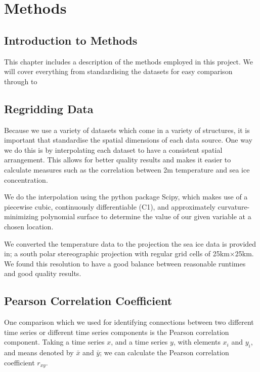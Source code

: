 \chapter{Methods}
\label{Chap:Methods}

\section{Introduction to Methods}
This chapter includes a description of the methods employed in this project. We will cover everything from standardising the datasets for easy comparison through to 

\section{Regridding Data}
Because we use a variety of datasets which come in a variety of structures, it is important that standardise the spatial dimensions of each data source. One way we do this is by interpolating each dataset to have a consistent spatial arrangement. This allows for better quality results and makes it easier to calculate measures such as the correlation between 2m temperature and sea ice concentration.

We do the interpolation using the python package Scipy, which makes use of a piecewise cubic, continuously differentiable (C1), and approximately curvature-minimizing polynomial surface to determine the value of our given variable at a chosen location. 

We converted the temperature data to the projection the sea ice data is provided in; a south polar stereographic projection with regular grid cells of 25km$\times$25km. We found this resolution to have a good balance between reasonable runtimes and good quality results.


\section{Pearson Correlation Coefficient}
\label{Methods:pearson}
One comparison which we used for identifying connections between two different time series or different time series components is the Pearson correlation component. Taking a time series $x$, and a time series $y$, with elements $x_i$ and $y_i$, and means denoted by $\bar{x}$ and $\bar{y}$; we can calculate the Pearson correlation coefficient $r_{xy}$.


